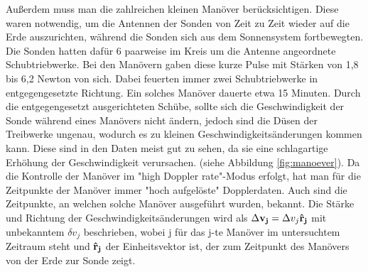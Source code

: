 Außerdem muss man die zahlreichen kleinen Manöver berücksichtigen. Diese waren notwendig, um die Antennen der Sonden von Zeit zu Zeit wieder auf die Erde auszurichten, während die Sonden sich aus dem Sonnensystem fortbewegten. Die Sonden hatten dafür 6 paarweise im Kreis um die Antenne angeordnete Schubtriebwerke. Bei den Manövern gaben diese kurze Pulse mit Stärken von 1,8 bis 6,2 Newton von sich. Dabei feuerten immer zwei Schubtriebwerke in entgegengesetzte Richtung. %
Ein solches Manöver dauerte etwa 15 Minuten\cite{Anderson2002}.
Durch die entgegengesetzt ausgerichteten Schübe, sollte sich die Geschwindigkeit der Sonde während eines Manövers nicht ändern, jedoch sind die Düsen der Treibwerke ungenau, wodurch es zu kleinen Geschwindigkeitsänderungen kommen kann.
Diese sind in den Daten meist gut zu sehen, da sie eine schlagartige Erhöhung der Geschwindigkeit verursachen. (siehe Abbildung \ref{fig:manoever}). Da die Kontrolle der Manöver im "high Doppler rate"-Modus erfolgt, hat man für die Zeitpunkte der Manöver immer "hoch aufgelöste" Dopplerdaten. Auch sind die Zeitpunkte, an welchen solche Manöver ausgeführt wurden, bekannt. Die Stärke und Richtung der Geschwindigkeitsänderungen wird als $\Delta {\bf v_j } = \Delta v_j { \bf \hat{r}_j}$ mit unbekanntem $\delta v_j$ beschrieben, wobei j für das j-te Manöver im untersuchtem Zeitraum steht und ${\bf \hat{r}_j}$ der Einheitsvektor ist, der zum Zeitpunkt des Manövers von der Erde zur Sonde zeigt.



